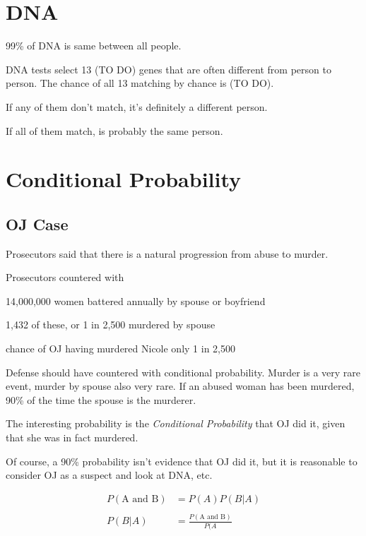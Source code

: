 \documentclass[landscape]{exam}
\begin{document}
  \section{DNA}
  99\% of DNA is same between all people.

  DNA tests select 13 (TO DO) genes that are often different from person to person. The
  chance of all 13 matching by chance is (TO DO).

  If any of them don't match, it's definitely a different person. 

  If all of them match, is probably the same person.
  
  \section{Conditional Probability}

  \subsection{OJ Case}
  Prosecutors said that there is a natural progression from abuse to murder.

  Prosecutors countered with 
  \begin{itemize*}
    \item 14,000,000 women battered annually by spouse or boyfriend
    \item 1,432 of these, or 1 in 2,500 murdered by spouse
    \item chance of OJ having murdered Nicole only 1 in 2,500
  \end{itemize*}

  Defense should have countered with conditional probability. Murder is a very
  rare event, murder by spouse also very rare. If an abused woman has been
  murdered, 90\% of the time the spouse is the murderer.

  The interesting probability is the {\em Conditional Probability} that OJ did
  it, given that she was in fact murdered.

  Of course, a 90\% probability isn't evidence that OJ did it, but it is
  reasonable to consider OJ as a suspect and look at DNA, etc.

  \begin{align*}
    P(\text{A and B}) &= P(A) P(B | A) \\
    \\
    P(B | A) &= \frac{P(\text{A and B})}{P(A} \\
  \end{align*}
\end{document}
